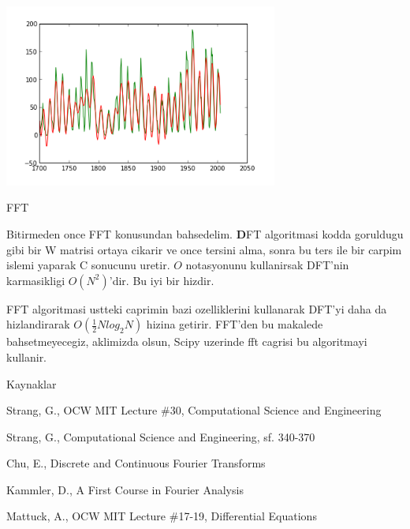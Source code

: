 \documentclass[12pt,fleqn]{article}\usepackage{../common}
\begin{document}
\includegraphics[height=6cm]{fourier_1.png}


FFT

Bitirmeden once FFT konusundan bahsedelim. $\textbf{D}$FT algoritmasi
kodda goruldugu gibi bir W matrisi ortaya cikarir ve once tersini
alma, sonra bu ters ile bir carpim islemi yaparak C sonucunu
uretir. $O$ notasyonunu kullanirsak DFT'nin karmasikligi
$O(N^2)$'dir. Bu iyi bir hizdir.

FFT algoritmasi ustteki caprimin bazi ozelliklerini kullanarak DFT'yi
daha da hizlandirarak $O(\frac{1}{2}Nlog_2N)$ hizina getirir. FFT'den
bu makalede bahsetmeyecegiz, aklimizda olsun, Scipy uzerinde fft
cagrisi bu algoritmayi kullanir.

Kaynaklar

Strang, G., OCW MIT Lecture \#30, Computational Science and Engineering

Strang, G., Computational Science and Engineering, sf. 340-370

Chu, E., Discrete and Continuous Fourier Transforms

Kammler, D., A First Course in Fourier Analysis

Mattuck, A., OCW MIT Lecture \#17-19, Differential Equations
\end{document}
